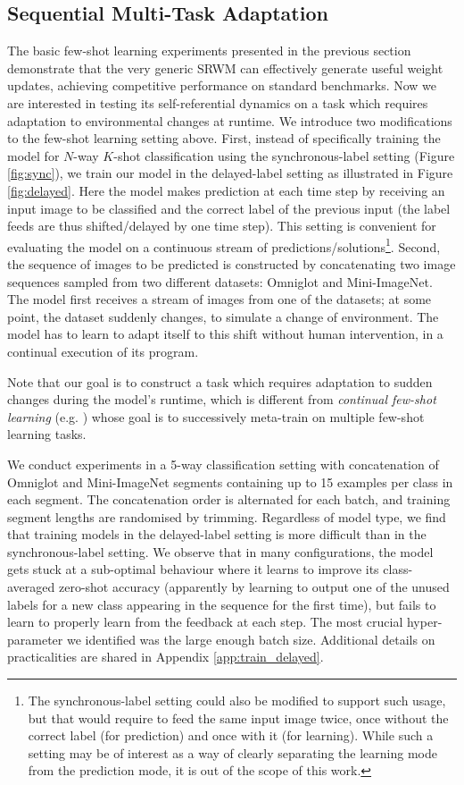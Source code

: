 \documentclass[nohyperref]{article}
\theoremstyle{plain}
\theoremstyle{definition}
\theoremstyle{remark}
\begin{document}
\subsection{Sequential Multi-Task Adaptation}
\label{sec:seq_multi}
The basic few-shot learning experiments presented in the previous section demonstrate that the very generic SRWM can effectively generate useful weight updates, achieving competitive performance on standard benchmarks.
Now we are interested in testing its self-referential dynamics on a task which requires adaptation to environmental changes at runtime.
We introduce two modifications to the few-shot learning
setting above.
First, instead of specifically training the model for $N$-way $K$-shot classification using the synchronous-label setting (Figure \ref{fig:sync}), we train our model
in the delayed-label setting \citep{hochreiter2001learning}
as illustrated in Figure \ref{fig:delayed}.
Here the model makes prediction at each time step
by receiving an input image to be classified and the correct label
of the previous input (the label feeds are thus shifted/delayed by one time step).
This setting is convenient for evaluating the model on a continuous stream of predictions/solutions\footnote{The synchronous-label setting could also be modified to support such usage, but that would require to feed the same input image twice, once without the correct label (for prediction) and once
with it (for learning). While such a setting may be of interest as a way of clearly separating the learning mode from the prediction mode, it is out of the scope of this work.}.
Second, the sequence of images to be predicted
is constructed by concatenating two image sequences  sampled from two different datasets: Omniglot and Mini-ImageNet.
The model first receives a stream of images
from one of the datasets; at some point, the dataset suddenly changes, to simulate a change of environment.
The model has to learn to adapt itself to this shift without human intervention, in a continual
execution of its program.

Note that our goal is to construct a task which requires adaptation to sudden changes during the model's runtime, which is different from \textit{continual few-shot learning} (e.g. \citet{yapRB21}) whose goal is to successively meta-train on multiple few-shot learning tasks.

We conduct experiments in
a 5-way classification setting with concatenation of Omniglot and Mini-ImageNet segments containing up to 15 examples per class in each segment.
The concatenation order is alternated for each batch,
and training segment lengths are randomised by trimming.
Regardless of model type, we find that training models in the delayed-label
setting is more difficult than in the synchronous-label setting.
We observe that in many configurations, the model gets stuck at a sub-optimal behaviour where it learns to improve its class-averaged zero-shot accuracy (apparently by learning to output one of the unused labels for a new class appearing in the sequence for the first time), but fails to learn to properly learn from the feedback at each step.
The most crucial hyper-parameter we identified was the large enough batch size.
Additional details on practicalities are shared in Appendix \ref{app:train_delayed}. 
\end{document}
